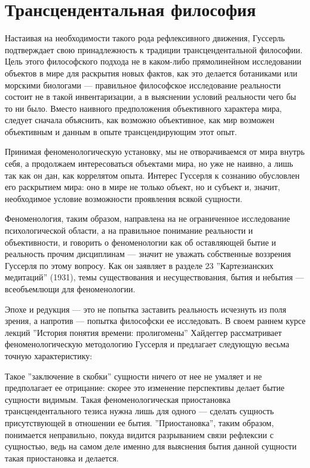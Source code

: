 \documentclass[11pt]{book}
\begin{document}
\section{Трансцендентальная философия}

Настаивая на необходимости такого рода рефлексивного движения, Гуссерль подтверждает свою принадлежность к традиции трансцендентальной философии. Цель этого философского подхода не в каком-либо прямолинейном исследовании объектов в мире для раскрытия новых фактов, как это делается ботаниками или морскими биологами --- правильное философское исследование реальности состоит не в такой инвентаризации, а в выяснении условий реальности чего бы то ни было. Вместо наивного предположения объективного характера мира, следует сначала объяснить, как возможно объективное, как мир возможен объективным и данным в опыте трансцендирующим этот опыт.

Принимая феноменологическую установку, мы не отворачиваемся от мира внутрь себя, а продолжаем интересоваться объектами мира, но уже не наивно, а лишь так как он дан, как коррелятом опыта. Интерес Гуссерля к сознанию обусловлен его раскрытием мира: оно в мире не только объект, но и субъект и, значит, необходимое условие возможности проявления всякой сущности.

Феноменология, таким образом, направлена на не ограниченное исследование психологической области, а на правильное понимание реальности и объективности, и говорить о феноменологии как об оставляющей бытие и реальность прочим дисциплинам --- значит не уважать собственные воззрения Гуссерля по этому вопросу. Как он заявляет в разделе 23 ''Картезианских медитаций'' (1931), темы существования и несуществования, бытия и небытия --- всеобъемлющи для феноменологии.

Эпохе и редукция --- это не попытка заставить реальность исчезнуть из поля зрения, а напротив --- попытка философски ее исследовать. В своем раннем курсе лекций ''История понятия времени: пролигомены'' Хайдеггер рассматривает феноменологическую методологию Гуссерля и предлагает следующую весьма точную характеристику:

\smallskip
{}\relax
{}\relax

Такое ''заключение в скобки'' сущности ничего от нее не умаляет и не предполагает ее отрицание: скорее это изменение перспективы делает бытие сущности видимым. Такая феноменологическая приостановка трансцендентального тезиса нужна лишь для одного --- сделать сущность присутствующей в отношении ее бытия. ''Приостановка'', таким образом, понимается неправильно, покуда видится разрыванием связи рефлексии с сущностью, ведь на самом деле именно для выяснения бытия данной сущности такая приостановка и делается.
\end{document}
